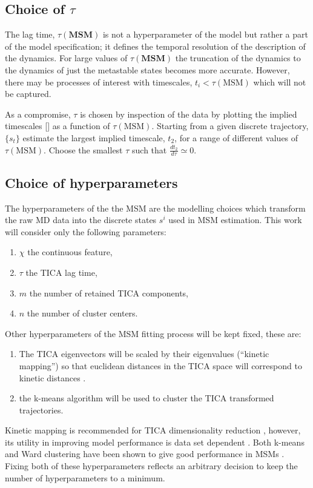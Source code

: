 \subsection{Choice of $\tau$}
The lag time, $\tau(\mathbf{MSM})$ is not a hyperparameter of the model but rather a part of the model specification; it defines the temporal resolution of the description of the dynamics. For large values of $\tau(\mathbf{MSM})$ the truncation of the dynamics to the dynamics of just the metastable states becomes more accurate. However, there may be processes of interest with timescales, $t_{i}<\tau(\mathrm{MSM})$ which will not be captured.

As a compromise, $\tau$ is chosen by inspection of the data by plotting the implied timescales [] as a function of $\tau(\mathrm{MSM})$.  Starting from a given discrete trajectory, $\{s_{t}\}$ estimate the largest implied timescale, $t_{2}$, for a range of different values of $\tau(\mathrm{MSM})$. Choose the smallest $\tau$ such that $\frac{d t_{2}}{d \tau} \simeq 0$. 

\subsection{Choice of hyperparameters}
The hyperparameters of the the MSM are the modelling choices which transform the raw MD data into the discrete states $s^{i}$ used in MSM estimation. This work will consider only the following parameters: 
\begin{enumerate}
    \item $\chi$ the continuous feature, 
    \item $\tau$ the TICA lag time, 
    \item $m$ the number of retained TICA components, 
    \item $n$ the number of cluster centers. 
\end{enumerate}
Other hyperparameters of the MSM fitting process will be kept fixed, these are: 
\begin{enumerate}
    \item The TICA eigenvectors will be scaled by their eigenvalues (``kinetic mapping'') so that euclidean distances in the TICA space will correspond to kinetic distances \cite{noeKineticDistanceKinetic2015}.
    \item the k-means algorithm will be used to cluster the TICA transformed trajectories. 
\end{enumerate}
Kinetic mapping is recommended for TICA dimensionality reduction \cite{noeKineticDistanceKinetic2015}, however, its utility in improving model performance is data set dependent \cite{husicOptimizedParameterSelection2016}.  Both k-means and Ward clustering have been shown to give good performance in MSMs \cite{husicWardClusteringImproves2017a}. Fixing both of these hyperparameters reflects an arbitrary decision to keep the number of hyperparameters to a minimum.

